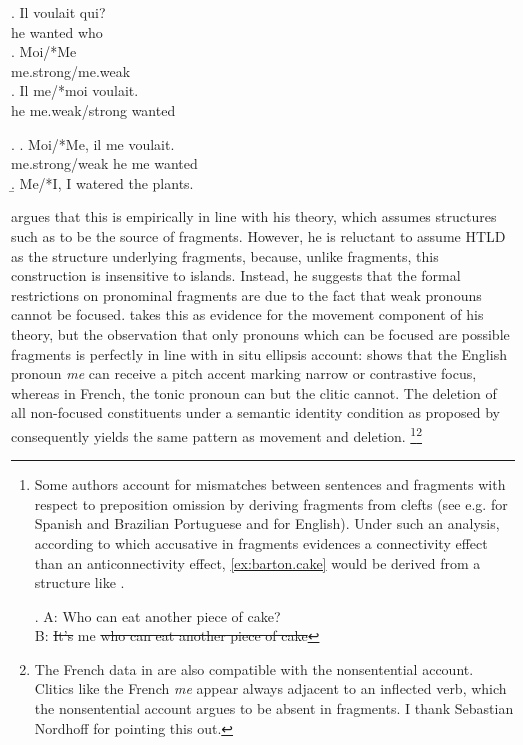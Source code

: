 \exg. Il voulait qui?\\
he wanted who\\
\hfill {}
\ag. Moi/*Me\\
me.strong/me.weak\\
\bg. Il me/*moi voulait.\\  
he me.weak/strong wanted\\

\ex. \ag. Moi/*Me, il me voulait.\\
me.strong/weak he me wanted\\
\hfill {}
\b. Me/*I, I watered the plants. \hfill \citep[703]{merchant2004}

\citeauthor{merchant2004} argues that this is empirically in line with his theory, which assumes structures such as \Last to be the source of fragments. However, he is reluctant to assume HTLD as the structure underlying fragments, because, unlike fragments, this construction is insensitive to islands. Instead, he suggests that the formal restrictions on pronominal fragments are due to the fact that weak pronouns cannot be focused. \citet{merchant2004} takes this as evidence for the movement component of his theory, but the observation that only pronouns which can be focused are possible fragments is perfectly in line with  in situ ellipsis account: \Next[a] shows that the English pronoun \textit{me} can receive a pitch accent marking narrow or contrastive focus, whereas in French, the tonic pronoun \Next[b] can but the clitic \Next[c] cannot. The deletion of all non-focused constituents under a semantic identity condition as proposed by \citet{reich2007} consequently yields the same pattern as movement and deletion.\largerpage%
%
\footnote{Some authors account for mismatches between sentences and fragments with respect to preposition omission by deriving fragments from clefts (see e.g. \citet{rodrigues.etal2009} for Spanish and Brazilian Portuguese and \citet{vancraenenbroeck2010} for English). Under such an analysis, according to which accusative in fragments evidences a connectivity effect than an anticonnectivity effect, \ref{ex:barton.cake} would be derived from a structure like \Next.

\ex. A: Who can eat another piece of cake?\\
     B: \sout{It's} me \sout{who can eat another piece of cake}

}\footnote{The French data in \TextNext are also compatible with the nonsentential account. Clitics like the French \textit{me} appear always adjacent to an inflected verb, which the nonsentential account argues to be absent in fragments. I thank Sebastian Nordhoff for pointing this out.}\afterfn%

